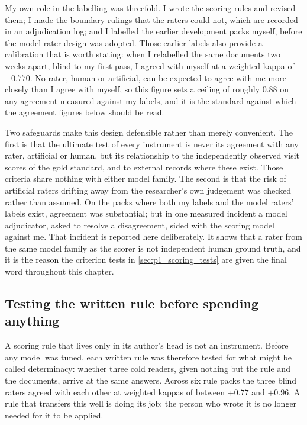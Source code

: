 My own role in the labelling was threefold. I wrote the scoring rules and
revised them; I made the boundary rulings that the raters could not, which
are recorded in an adjudication log; and I labelled the earlier development
packs myself, before the model-rater design was adopted. Those earlier
labels also provide a calibration that is worth stating: when I relabelled
the same documents two weeks apart, blind to my first pass, I agreed with
myself at a weighted kappa of $+0.770$. No rater, human or artificial, can
be expected to agree with me more closely than I agree with myself, so this
figure sets a ceiling of roughly $0.88$ on any agreement measured against my
labels, and it is the standard against which the agreement figures below
should be read.

Two safeguards make this design defensible rather than merely convenient.
The first is that the ultimate test of every instrument is never its
agreement with any rater, artificial or human, but its relationship to the
independently observed visit scores of the gold standard, and to external
records where these exist. Those criteria share nothing with either model
family. The second is that the risk of artificial raters drifting away from
the researcher's own judgement was checked rather than assumed. On the packs
where both my labels and the model raters' labels exist, agreement was
substantial; but in one measured incident a model adjudicator, asked to
resolve a disagreement, sided with the scoring model against me. That
incident is reported here deliberately. It shows that a rater from the same
model family as the scorer is not independent human ground truth, and it is
the reason the criterion tests in \cref{sec:p1_scoring_tests} are given the
final word throughout this chapter.

\subsection{Testing the written rule before spending anything}
\label{sec:p1_scoring_rules}

A scoring rule that lives only in its author's head is not an instrument.
Before any model was tuned, each written rule was therefore tested for what
might be called determinacy: whether three cold readers, given nothing but
the rule and the documents, arrive at the same answers. Across six rule
packs the three blind raters agreed with each other at weighted kappas of
between $+0.77$ and $+0.96$. A rule that transfers this well is doing its
job; the person who wrote it is no longer needed for it to be applied.

